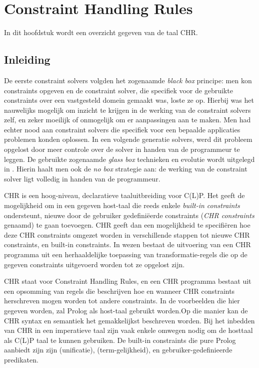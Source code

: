 \chapter{Constraint Handling Rules}

In dit hoofdstuk wordt een overzicht gegeven van de taal CHR.

\section{Inleiding}

De eerste constraint solvers volgden het zogenaamde {\em black box} principe: men kon constraints opgeven en de constraint solver, die specifiek voor de gebruikte constraints over een vastgesteld domein gemaakt was, loste ze op. Hierbij was het nauwelijks mogelijk om inzicht te krijgen in de werking van de constraint solvers zelf, en zeker moeilijk of onmogelijk om er aanpassingen aan te maken. Men had echter nood aan constraint solvers die specifiek voor een bepaalde applicaties problemen konden oplossen. In een volgende generatie solvers, werd dit probleem opgelost door meer controle over de solver in handen van de programmeur te leggen. De gebruikte zogenaamde  {\em glass box} technieken en evolutie wordt uitgelegd in \cite{chr}. Hierin haalt men ook de {\em no box} strategie aan: de werking van de constraint solver ligt volledig in handen van de programmeur.

CHR is een hoog-niveau, declaratieve taaluitbreiding voor C(L)P. Het geeft de mogelijkheid om in een gegeven host-taal die reeds enkele {\em built-in constraints} ondersteunt, nieuwe door de gebruiker gedefini\"eerde constraints ({\em CHR constraints} genaamd) te gaan toevoegen. CHR geeft dan een mogelijkheid te specifi\"eren hoe deze CHR constraints omgezet worden in verschillende stappen tot nieuwe CHR constraints, en built-in constraints. In wezen bestaat de uitvoering van een CHR programma uit een herhaaldelijke toepassing van transformatie-regels die op de gegeven constraints uitgevoerd worden tot ze opgelost zijn.

CHR staat voor Constraint Handling Rules, en een CHR programma bestaat uit een opsomming van regels die beschrijven hoe en wanneer CHR constraints herschreven mogen worden tot andere constraints. In de voorbeelden die hier gegeven worden, zal Prolog als host-taal gebruikt worden.Op die manier kan de CHR syntax en semantiek het gemakkelijkst beschreven worden. Bij het inbedden van CHR in een imperatieve taal zijn vaak enkele omwegen nodig om de hosttaal als C(L)P taal te kunnen gebruiken. De built-in constraints die pure Prolog aanbiedt zijn zijn \code{=} (unificatie), \code{==} (term-gelijkheid), en gebruiker-gedefinieerde predikaten.

